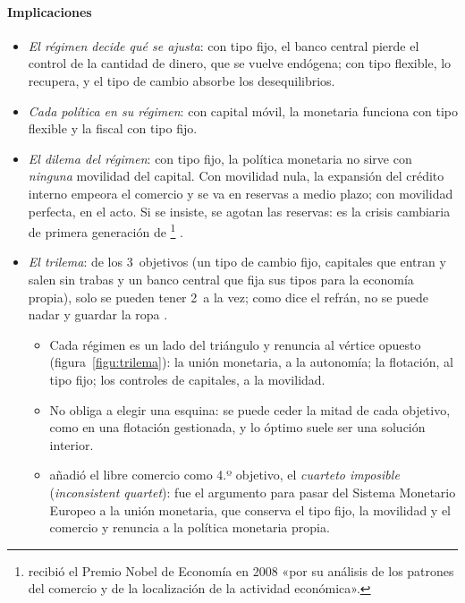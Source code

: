 \documentclass[11pt]{article}
\begin{document}
\paragraph{Implicaciones}

\begin{itemize}
\item \emph{El régimen decide qué se ajusta}: con tipo fijo, el banco central pierde el control de la cantidad de dinero, que se vuelve endógena; con tipo flexible, lo recupera, y el tipo de cambio absorbe los desequilibrios.
\item \emph{Cada política en su régimen}: con capital móvil, la monetaria funciona con tipo flexible y la fiscal con tipo fijo.
\item \emph{El dilema del régimen}: con tipo fijo, la política monetaria no sirve con \emph{ninguna} movilidad del capital. Con movilidad nula, la expansión del crédito interno empeora el comercio y se va en reservas a medio plazo; con movilidad perfecta, en el acto. Si se insiste, se agotan las reservas: es la crisis cambiaria de primera generación de \textcite{Krugman1979Model}\footnote{ recibió el Premio Nobel de Economía en 2008 «por su análisis de los patrones del comercio y de la localización de la actividad económica»\nocite{Nobel2008Krugman}.} .
\item \emph{El trilema}: de los 3~objetivos (un tipo de cambio fijo, capitales que entran y salen sin trabas y un banco central que fija sus tipos para la economía propia), solo se pueden tener 2~a la vez; como dice el refrán, no se puede nadar y guardar la ropa\nocite{ObstfeldShambaughTaylor2005} .
  \begin{itemize}
  \item Cada régimen es un lado del triángulo y renuncia al vértice opuesto (figura~\ref{figu:trilema}): la unión monetaria, a la autonomía; la flotación, al tipo fijo; los controles de capitales, a la movilidad.
  \item No obliga a elegir una esquina: se puede ceder la mitad de cada objetivo, como en una flotación gestionada, y lo óptimo suele ser una solución interior\nocite{Frankel1999NoSingle}.
  \item \textcite{PadoaSchioppa1988} añadió el libre comercio como 4.º objetivo, el \emph{cuarteto imposible} (\emph{inconsistent quartet}): fue el argumento para pasar del Sistema Monetario Europeo a la unión monetaria, que conserva el tipo fijo, la movilidad y el comercio y renuncia a la política monetaria propia.
  \end{itemize}
\end{itemize}
\end{document}
